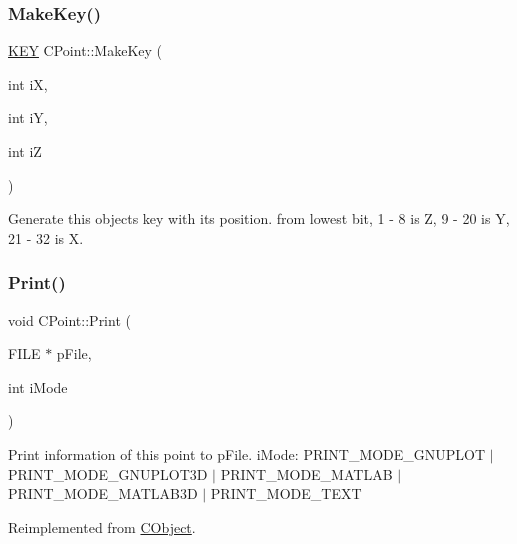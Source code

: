 \mbox{\label{classCPoint_aa93327a1be5e5d9df55f3eb9750af25d}} 
\subsubsection{\texorpdfstring{MakeKey()}{MakeKey()}}
{\footnotesize\ttfamily \mbox{\hyperlink{res2dmp_8cpp_a8ae9d53f33f46cfcfcb9736e6351452a}{K\+EY}} C\+Point\+::\+Make\+Key (\begin{DoxyParamCaption}\item[{int}]{iX,  }\item[{int}]{iY,  }\item[{int}]{iZ }\end{DoxyParamCaption})\hspace{0.3cm}{\ttfamily [static]}}

Generate this object\textquotesingle{}s key with its position. from lowest bit, 1 -\/ 8 is Z, 9 -\/ 20 is Y, 21 -\/ 32 is X. \mbox{\label{classCPoint_a1610463f19b7ff508ed229791dd6335d}} 
\subsubsection{\texorpdfstring{Print()}{Print()}}
{\footnotesize\ttfamily void C\+Point\+::\+Print (\begin{DoxyParamCaption}\item[{F\+I\+LE $\ast$}]{p\+File,  }\item[{int}]{i\+Mode }\end{DoxyParamCaption})\hspace{0.3cm}{\ttfamily [virtual]}}

Print information of this point to p\+File. i\+Mode\+: P\+R\+I\+N\+T\+\_\+\+M\+O\+D\+E\+\_\+\+G\+N\+U\+P\+L\+OT $\vert$ P\+R\+I\+N\+T\+\_\+\+M\+O\+D\+E\+\_\+\+G\+N\+U\+P\+L\+O\+T3D $\vert$ P\+R\+I\+N\+T\+\_\+\+M\+O\+D\+E\+\_\+\+M\+A\+T\+L\+AB $\vert$ P\+R\+I\+N\+T\+\_\+\+M\+O\+D\+E\+\_\+\+M\+A\+T\+L\+A\+B3D $\vert$ P\+R\+I\+N\+T\+\_\+\+M\+O\+D\+E\+\_\+\+T\+E\+XT 

Reimplemented from \mbox{\hyperlink{classCObject_a75afd905b2d14ed374c75d90f079a389}{C\+Object}}.

\mbox{\label{classCPoint_ac9557dddaefffd4c7cc0a20090ef5324}} 
